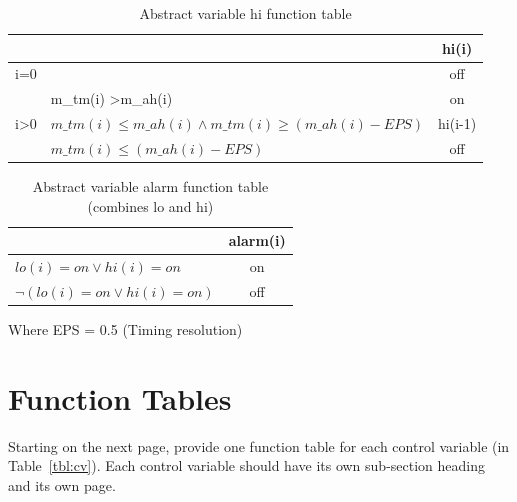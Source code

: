 \documentclass[fontsize=12pt,paper=letter,twoside]{scrartcl}
\begin{document}
\begin{table}[h]
\centering
\begin{tabular}{ll|c|}
\cline{3-3}
                                                      &                                                                         & hi(i)   \\ \hline
\multicolumn{1}{|l|}{i=0}                             &                                                                         & off     \\ \hline
\multicolumn{1}{|l|}{\multirow{3}{*}{i\textgreater0}} & m\_tm(i) \textgreater m\_ah(i)                                          & on      \\ \cline{2-3} 
\multicolumn{1}{|l|}{}                                & $m\_tm(i) \leq m\_ah(i) \wedge m\_tm(i) \ge (m\_ah(i) - EPS)$ & hi(i-1) \\ \cline{2-3} 
\multicolumn{1}{|l|}{}                                & $m\_tm(i) \leq (m\_ah(i) - EPS)$                                     & off     \\ \hline
\end{tabular}
\caption{Abstract variable hi function table}
\label{my-label}
\end{table}


\begin{table}[h]
\centering
\begin{tabular}{l|c|}
\cline{2-2}
                                                    & alarm(i) \\ \hline
\multicolumn{1}{|l|}{$lo(i) = on \vee hi(i) = on$}       & on       \\ \hline
\multicolumn{1}{|l|}{$\neg (lo(i) = on \vee hi(i) = on)$} & off      \\ \hline
\end{tabular}
\caption{Abstract variable alarm function table (combines lo and hi)}
\label{my-label}
\end{table}

Where EPS = 0.5 (Timing resolution)



\section{Function Tables}

Starting on the next page, provide one function table for each control variable (in Table~\ref{tbl:cv}). Each control variable should have its own sub-section heading and its own page.
\end{document}
